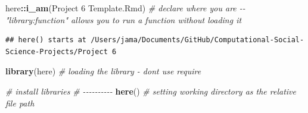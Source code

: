\documentclass[
]{article}
\newenvironment{Shaded}{\begin{snugshade}}{\end{snugshade}}
\newcommand{\AttributeTok}[1]{\textcolor[rgb]{0.13,0.29,0.53}{#1}}
\newcommand{\CommentTok}[1]{\textcolor[rgb]{0.56,0.35,0.01}{\textit{#1}}}
\newcommand{\ConstantTok}[1]{\textcolor[rgb]{0.56,0.35,0.01}{#1}}
\newcommand{\DecValTok}[1]{\textcolor[rgb]{0.00,0.00,0.81}{#1}}
\newcommand{\FunctionTok}[1]{\textcolor[rgb]{0.13,0.29,0.53}{\textbf{#1}}}
\newcommand{\NormalTok}[1]{#1}
\newcommand{\SpecialCharTok}[1]{\textcolor[rgb]{0.81,0.36,0.00}{\textbf{#1}}}
\newcommand{\StringTok}[1]{\textcolor[rgb]{0.31,0.60,0.02}{#1}}
\begin{document}
\begin{Shaded}
\end{Shaded}

\begin{Shaded}
\begin{Highlighting}[]
\NormalTok{here}\SpecialCharTok{::}\FunctionTok{i\_am}\NormalTok{(}\StringTok{\textquotesingle{}Project 6 Template.Rmd\textquotesingle{}}\NormalTok{) }\CommentTok{\# declare where you are {-}{-} "library:function"  allows you to run a function without loading it}
\end{Highlighting}
\end{Shaded}

\begin{verbatim}
## here() starts at /Users/jama/Documents/GitHub/Computational-Social-Science-Projects/Project 6
\end{verbatim}

\begin{Shaded}
\begin{Highlighting}[]
\FunctionTok{library}\NormalTok{(here)                 }\CommentTok{\# loading the library  {-} don\textquotesingle{}t use require}

\CommentTok{\# install libraries }
\CommentTok{\# {-}{-}{-}{-}{-}{-}{-}{-}{-}{-}}
\FunctionTok{here}\NormalTok{()                        }\CommentTok{\# setting working directory as the relative file path}
\end{Highlighting}
\end{Shaded}
\end{document}

